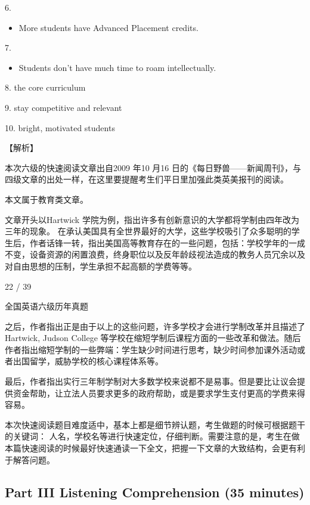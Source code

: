 \documentclass[UTF8,11pt]{ctexart}
\begin{document}
6.


\begin{itemize}[leftmargin=2em,itemsep=.2em,topsep=.4em]\item[B.] More students have Advanced Placement credits.
\end{itemize}

7.


\begin{itemize}[leftmargin=2em,itemsep=.2em,topsep=.4em]\item[A.] Students don’t have much time to roam intellectually.
\end{itemize}

8. the core curriculum


9. stay competitive and relevant


10. bright, motivated students


【解析】


本次六级的快速阅读文章出自2009 年10 月16 日的《每日野兽——新闻周刊》，与四级文章的出处一样，在这里要提醒考生们平日里加强此类英美报刊的阅读。


本文属于教育类文章。


文章开头以Hartwick 学院为例，指出许多有创新意识的大学都将学制由四年改为三年的现象。 在承认美国具有全世界最好的大学，这些学校吸引了众多聪明的学生后，作者话锋一转，指出美国高等教育存在的一些问题，包括：学校学年的一成不变，设备资源的闲置浪费，终身职位以及反年龄歧视法造成的教务人员冗余以及对自由思想的压制，学生承担不起高额的学费等等。


22 / 39


全国英语六级历年真题


之后，作者指出正是由于以上的这些问题，许多学校才会进行学制改革并且描述了Hartwick, Judson College 等学校在缩短学制后课程方面的一些改革和做法。随后作者指出缩短学制的一些弊端：学生缺少时间进行思考，缺少时间参加课外活动或者出国留学，威胁学校的核心课程体系等。


最后，作者指出实行三年制学制对大多数学校来说都不是易事。但是要比让议会提供资金帮助，让立法人员要求更多的政府帮助，或是要求学生支付更高的学费来得容易。


本次快速阅读题目难度适中，基本上都是细节辨认题，考生做题的时候可根据题干的关键词： 人名，学校名等进行快速定位，仔细判断。需要注意的是，考生在做本篇快速阅读的时候最好快速通读一下全文，把握一下文章的大致结构，会更有利于解答问题。


\subsection*{\textbf{Part III} \textbf{Listening Comprehension} \textbf{(35 minutes)}}
\end{document}
